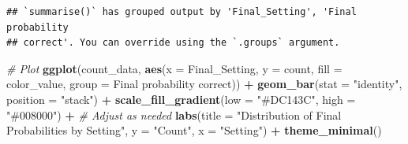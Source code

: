 \documentclass[
]{article}
\newenvironment{Shaded}{\begin{snugshade}}{\end{snugshade}}
\newcommand{\AttributeTok}[1]{\textcolor[rgb]{0.13,0.29,0.53}{#1}}
\newcommand{\CommentTok}[1]{\textcolor[rgb]{0.56,0.35,0.01}{\textit{#1}}}
\newcommand{\FloatTok}[1]{\textcolor[rgb]{0.00,0.00,0.81}{#1}}
\newcommand{\FunctionTok}[1]{\textcolor[rgb]{0.13,0.29,0.53}{\textbf{#1}}}
\newcommand{\NormalTok}[1]{#1}
\newcommand{\OtherTok}[1]{\textcolor[rgb]{0.56,0.35,0.01}{#1}}
\newcommand{\SpecialCharTok}[1]{\textcolor[rgb]{0.81,0.36,0.00}{\textbf{#1}}}
\newcommand{\StringTok}[1]{\textcolor[rgb]{0.31,0.60,0.02}{#1}}
\begin{document}
\begin{Shaded}
\end{Shaded}

\begin{verbatim}
## `summarise()` has grouped output by 'Final_Setting', 'Final probability
## correct'. You can override using the `.groups` argument.
\end{verbatim}

\begin{Shaded}
\begin{Highlighting}[]
\CommentTok{\# Plot}
\FunctionTok{ggplot}\NormalTok{(count\_data, }\FunctionTok{aes}\NormalTok{(}\AttributeTok{x =} \StringTok{\textasciigrave{}}\AttributeTok{Final\_Setting}\StringTok{\textasciigrave{}}\NormalTok{, }\AttributeTok{y =}\NormalTok{ count, }\AttributeTok{fill =}\NormalTok{ color\_value, }\AttributeTok{group =} \StringTok{\textasciigrave{}}\AttributeTok{Final probability correct}\StringTok{\textasciigrave{}}\NormalTok{)) }\SpecialCharTok{+}
  \FunctionTok{geom\_bar}\NormalTok{(}\AttributeTok{stat =} \StringTok{"identity"}\NormalTok{, }\AttributeTok{position =} \StringTok{"stack"}\NormalTok{) }\SpecialCharTok{+}
  \FunctionTok{scale\_fill\_gradient}\NormalTok{(}\AttributeTok{low =} \StringTok{"\#DC143C"}\NormalTok{, }\AttributeTok{high =} \StringTok{"\#008000"}\NormalTok{) }\SpecialCharTok{+}  \CommentTok{\# Adjust as needed}
  \FunctionTok{labs}\NormalTok{(}\AttributeTok{title =} \StringTok{"Distribution of Final Probabilities by Setting"}\NormalTok{, }\AttributeTok{y =} \StringTok{"Count"}\NormalTok{, }\AttributeTok{x =} \StringTok{"Setting"}\NormalTok{) }\SpecialCharTok{+}
  \FunctionTok{theme\_minimal}\NormalTok{()}
\end{Highlighting}
\end{Shaded}
\end{document}

